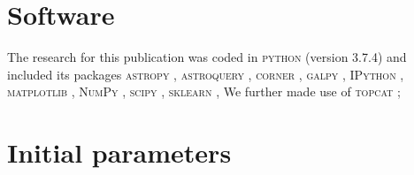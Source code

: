 \documentclass[
  journal=pasa,
  manuscript=research-paper, %
  year=2023,
  volume=37
]{cup-journal}
\begin{document}
\section*{Software}

The research for this publication was coded in \textsc{python} (version 3.7.4) and included its packages
\textsc{astropy} \citep[v. 3.2.2;][]{Robitaille2013,PriceWhelan2018},
\textsc{astroquery} \citep[v. 0.4;][]{Ginsburg2019},
\textsc{corner} \citep[v. 2.0.1;][]{corner},
\textsc{galpy} \citep[version 1.6.0;][]{Bovy2015},
\textsc{IPython} \citep[v. 7.8.0;][]{ipython},
\textsc{matplotlib} \citep[v. 3.1.3;][]{matplotlib},
\textsc{NumPy} \citep[v. 1.17.2;][]{numpy},
\textsc{scipy} \citep[version 1.3.1;][]{scipy},
\textsc{sklearn} \citep[v. 0.21.3;][]{scikit-learn},
We further made use of \textsc{topcat} \citep[version 4.7;][]{Taylor2005};




\appendix

\section{Initial parameters}
\end{document}

